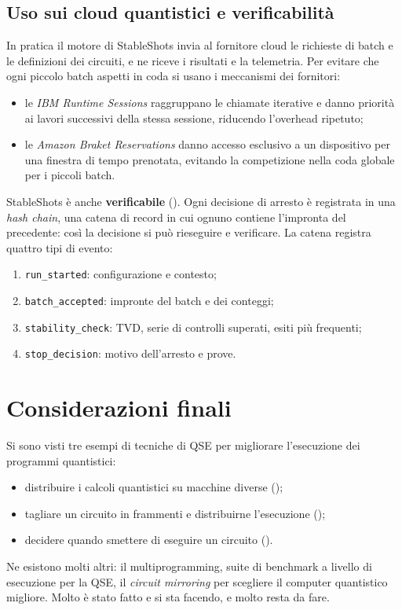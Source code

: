 \subsection{Uso sui cloud quantistici e verificabilità}

In pratica il motore di StableShots invia al fornitore cloud le richieste di batch e le definizioni dei circuiti, e ne
riceve i risultati e la telemetria. Per evitare che ogni piccolo batch aspetti in coda si usano i meccanismi dei
fornitori:
\begin{itemize}
  \item le \emph{IBM Runtime Sessions} raggruppano le chiamate iterative e danno priorità ai lavori successivi della
    stessa sessione, riducendo l'overhead ripetuto;
  \item le \emph{Amazon Braket Reservations} danno accesso esclusivo a un dispositivo per una finestra di tempo
    prenotata, evitando la competizione nella coda globale per i piccoli batch.
\end{itemize}

StableShots è anche \textbf{verificabile} (). Ogni decisione di arresto è registrata in una \emph{hash
chain}, una catena di record in cui ognuno contiene l'impronta del precedente: così la decisione si può rieseguire e
verificare. La catena registra quattro tipi di evento:
\begin{enumerate}
  \item \texttt{run\_started}: configurazione e contesto;
  \item \texttt{batch\_accepted}: impronte del batch e dei conteggi;
  \item \texttt{stability\_check}: TVD, serie di controlli superati, esiti più frequenti;
  \item \texttt{stop\_decision}: motivo dell'arresto e prove.
\end{enumerate}

\section{Considerazioni finali}
\label{sec:qse-conclusioni}

Si sono visti tre esempi di tecniche di QSE per migliorare l'esecuzione dei programmi quantistici:
\begin{itemize}
  \item distribuire i calcoli quantistici su macchine diverse ();
  \item tagliare un circuito in frammenti e distribuirne l'esecuzione ();
  \item decidere quando smettere di eseguire un circuito ().
\end{itemize}
Ne esistono molti altri: il multiprogramming, suite di benchmark a livello di esecuzione per la QSE, il
\emph{circuit mirroring} per scegliere il computer quantistico migliore. Molto è stato fatto e si sta facendo, e molto
resta da fare.

